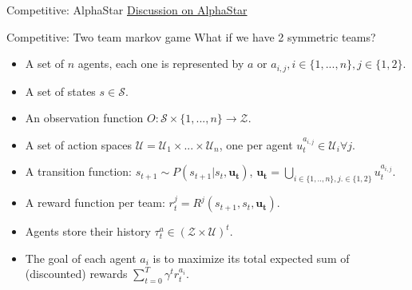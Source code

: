 \documentclass[9pt, hyperref={pdfusetitle,colorlinks=true,allcolors=DarkBlue}]{beamer}
\begin{document}
\begin{frame}{Competitive: AlphaStar}
\href{https://www.deepmind.com/blog/alphastar-mastering-the-real-time-strategy-game-starcraft-ii}{Discussion on AlphaStar}
\end{frame}

\begin{frame}{Competitive: Two team markov game}
What if we have 2 symmetric teams?
    \begin{itemize}
        \item A set of $n$ agents, each one is represented by $a$ or $a_{i, j}, i \in  \{1,...,n\}, j \in \{1, 2\}$.
        \vfill
        \item A set of states $s \in \mathcal{S}$.
        \vfill
        \item An observation function $O:\mathcal{S} \times \{1,...,n\} \rightarrow \mathcal{Z}$.
        \vfill
        \item A set of action spaces $\mathcal{U}=\mathcal{U}_1 \times ... \times \mathcal{U}_n$, one per agent $u^{a_{i,j}}_{t} \in \mathcal{U}_i \forall j$.
        \vfill
        \item A transition function: $s_{t+1} \sim P(s_{t+1} | s_t, \boldsymbol{u_t})$,  $\boldsymbol{u_t}=\bigcup_{i \in \{1,..,n\},j. \in \{1,2\}} u^{a_{i,j}}_t$.
        \vfill
        \item A reward function per team:  $r^j_t = R^j(s_{t+1}, s_t, \boldsymbol{u_t})$.
        \vfill
        \item Agents store their history $\tau^a_t \in (\mathcal{Z} \times \mathcal{U})^t$.
        \vfill
        \item The goal of each agent $a_i$ is to maximize its total expected sum of (discounted) rewards $\sum_{t=0}^{T} \gamma^t r^{a_i}_t$.
    \end{itemize}{}

\end{frame}
\end{document}
